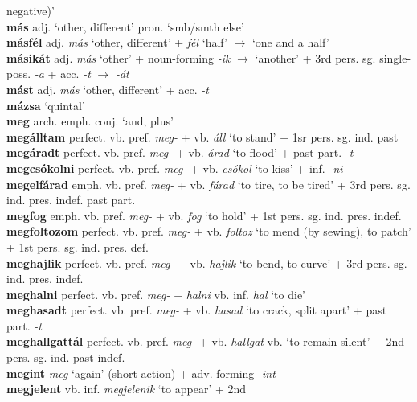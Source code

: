 \documentclass[11pt]{article}
\begin{document}
negative)' \\
\textbf{más} adj. `other, different' \textbar\textbar{}
pron. `smb/smth else' \\
\textbf{másfél} adj. \emph{más} `other, different' + \emph{fél} `half'
$\rightarrow$ `one and a half' \\
\textbf{másikát} adj. \emph{más} `other' +
noun\hyp{}forming \emph{-ik} $\rightarrow$ `another' + 3rd
  pers. sg. single\hyp{}poss. \emph{-a} + acc. \emph{-t}
  $\rightarrow$ \emph{-át} \\
\textbf{mást} adj. \emph{más} `other, different' + acc. \emph{-t} \\
\textbf{mázsa} `quintal' \\
\textbf{meg} arch. emph. \textbar\textbar{} conj. `and, plus' \\
\textbf{megálltam} perfect. vb. pref. \emph{meg-} + vb. \emph{áll} `to
  stand' + 1sr pers. sg. ind. past \\
\textbf{megáradt} perfect. vb. pref. \emph{meg-} + vb. \emph{árad} `to
flood' + past part. \emph{-t} \\
\textbf{megcsókolni} perfect. vb. pref. \emph{meg-} +
vb. \emph{csókol} `to kiss' + inf. \emph{-ni} \\
\textbf{megelfárad} emph. vb. pref. \emph{meg-} + vb. \emph{fárad} `to
tire, to be tired' + 3rd
pers. sg. ind. pres. indef. \textbar\textbar{} past part. \\
\textbf{megfog} emph. vb. pref. \emph{meg-} + vb. \emph{fog} `to hold'
+ 1st pers. sg. ind. pres. indef. \\
\textbf{megfoltozom} perfect. vb. pref. \emph{meg-} +
vb. \emph{foltoz} `to mend (by sewing), to patch' + 1st
pers. sg. ind. pres. def. \\
\textbf{meghajlik} perfect. vb. pref. \emph{meg-} + vb. \emph{hajlik}
`to bend, to curve' + 3rd pers. sg. ind. pres. indef. \\
\textbf{meghalni} perfect. vb. pref. \emph{meg-} + \emph{halni}
vb. inf. \emph{hal} `to die' \\
\textbf{meghasadt} perfect. vb. pref. \emph{meg-} + vb. \emph{hasad}
`to crack, split apart' + past part. \emph{-t} \\
\textbf{meghallgattál} perfect. vb. pref. \emph{meg-}
+ vb. \emph{hallgat} vb. `to remain silent' + 2nd pers. sg. ind. past
indef. \\
\textbf{megint} \emph{meg} `again' (short action) +
adv.\hyp{}forming \emph{-int} \\
\textbf{megjelent} vb. inf. \emph{megjelenik} `to appear' + 2nd
\end{document}
